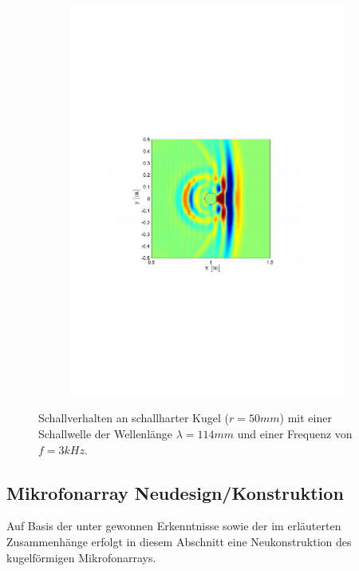 \begin{figure}
\begin{subfigure}[b]{0.48\textwidth}
                \includegraphics[width=\textwidth]{images/02_Konzeptionierung/sim_wave_3000_4}
        \end{subfigure}
        \caption{Schallverhalten an schallharter Kugel ($r=50mm$) mit einer Schallwelle der Wellenlänge $\lambda = 114mm$ und einer Frequenz von $f=3kHz$.}
        \label{fig:sim_wave_3000}
\end{figure}






\subsection{Mikrofonarray Neudesign/Konstruktion}
\label{subsec:MikrofonarrayNeudesign}
Auf Basis der unter  gewonnen Erkenntnisse sowie der im  erläuterten Zusammenhänge erfolgt in diesem Abschnitt eine Neukonstruktion des kugelförmigen Mikrofonarrays.

